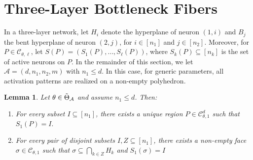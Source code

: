 \documentclass{article}
\newtheorem{lemma}[theorem]{Lemma}
\theoremstyle{definition}
\newcommand{\architecture}{\mathcal{A}}
\newcommand{\gparamspace}[1]{\Tilde{\Theta}_{#1}}
\newcommand{\complex}{\mathcal{C}}
\begin{document}
\section{Three-Layer Bottleneck Fibers} 
In a three-layer network, let $H_i$ denote the hyperplane of neuron $(1,i)$ and $B_j$ the bent hyperplane of neuron $(2,j)$, for $i \in [n_1]$ and $j \in [n_2]$. 
Moreover, for $P\in \complex_{\theta,\ell}$, let $S(P)=(S_1(P),\ldots,S_\ell(P))$, where $S_k(P) \subseteq [n_k]$ is the set of active neurons on $P$. 
%
In the remainder of this section, we let $\architecture=(d,n_1,n_2,m)$ with $n_1 \leq d$. 
In this case, for generic parameters, all activation patterns are realized on a non-empty polyhedron.
\begin{lemma}
\label{lem:first-layer-patterns-exist}
Let $\theta \in \gparamspace{\architecture}$ and assume $n_1\le d$. Then:  
%
\begin{enumerate}[leftmargin=*]
    \item For every subset $I\subseteq [n_1]$, there exists a unique region
    $P \in \complex_{\theta,1}^{d}$ such that
    $
    S_1(P)=I.
    $

    \item For every pair of disjoint subsets $I,Z \subseteq [n_1]$, there exists a non-empty face
    $\sigma \in \complex_{\theta,1}$ such that
    $
    \sigma \subseteq \bigcap_{k\in Z} H_k
$ and $S_1(\sigma) =I$ 

\end{enumerate}
\end{lemma}
\end{document}
